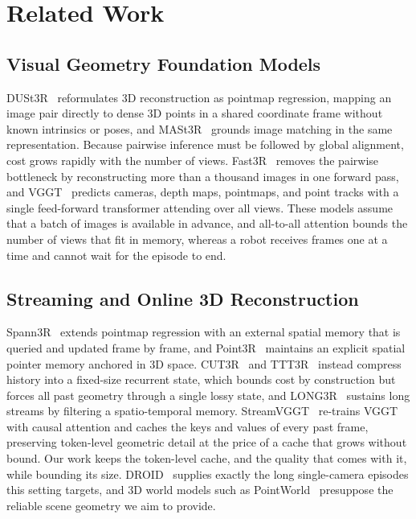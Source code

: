 \section{Related Work}
\label{sec:related}

\subsection{Visual Geometry Foundation Models}
DUSt3R~\cite{wang2024dust3r} reformulates 3D reconstruction as pointmap regression, mapping an image pair directly to dense 3D points in a shared coordinate frame without known intrinsics or poses, and MASt3R~\cite{leroy2024mast3r} grounds image matching in the same representation. Because pairwise inference must be followed by global alignment, cost grows rapidly with the number of views. Fast3R~\cite{yang2025fast3r} removes the pairwise bottleneck by reconstructing more than a thousand images in one forward pass, and VGGT~\cite{wang2025vggt} predicts cameras, depth maps, pointmaps, and point tracks with a single feed-forward transformer attending over all views. These models assume that a batch of images is available in advance, and all-to-all attention bounds the number of views that fit in memory, whereas a robot receives frames one at a time and cannot wait for the episode to end.

\subsection{Streaming and Online 3D Reconstruction}
Spann3R~\cite{wang2025spann3r} extends pointmap regression with an external spatial memory that is queried and updated frame by frame, and Point3R~\cite{wu2025point3r} maintains an explicit spatial pointer memory anchored in 3D space. CUT3R~\cite{wang2025cut3r} and TTT3R~\cite{chen2025ttt3r} instead compress history into a fixed-size recurrent state, which bounds cost by construction but forces all past geometry through a single lossy state, and LONG3R~\cite{chen2025long3r} sustains long streams by filtering a spatio-temporal memory. StreamVGGT~\cite{zhuo2025streamvggt} re-trains VGGT with causal attention and caches the keys and values of every past frame, preserving token-level geometric detail at the price of a cache that grows without bound. Our work keeps the token-level cache, and the quality that comes with it, while bounding its size. DROID~\cite{khazatsky2024droid} supplies exactly the long single-camera episodes this setting targets, and 3D world models such as PointWorld~\cite{huang2026pointworld} presuppose the reliable scene geometry we aim to provide.

